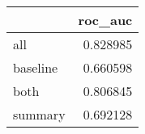 \begin{tabular}{lr}
\toprule
{} &   roc\_auc \\
\midrule
all      &  0.828985 \\
baseline &  0.660598 \\
both     &  0.806845 \\
summary  &  0.692128 \\
\bottomrule
\end{tabular}
